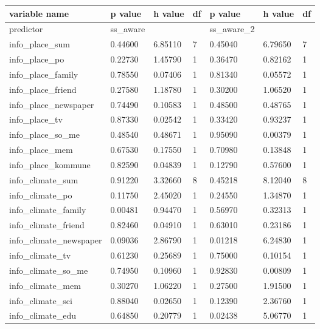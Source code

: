 \documentclass{article}
\begin{document}
\begin{table}[!ht]
    \centering
    \begin{tabular}{|l|l|l|l|l|l|l|}
    \hline
        variable name & p value & h value & df & p value & h value & df \\ \hline
        predictor & ss\_aware & ~ & ~ & ss\_aware\_2 & ~ & ~ \\ \hline
        info\_place\_sum & 0.44600 & 6.85110 & 7 & 0.45040 & 6.79650 & 7 \\ \hline
        info\_place\_po & 0.22730 & 1.45790 & 1 & 0.36470 & 0.82162 & 1 \\ \hline
        info\_place\_family & 0.78550 & 0.07406 & 1 & 0.81340 & 0.05572 & 1 \\ \hline
        info\_place\_friend & 0.27580 & 1.18780 & 1 & 0.30200 & 1.06520 & 1 \\ \hline
        info\_place\_newspaper & 0.74490 & 0.10583 & 1 & 0.48500 & 0.48765 & 1 \\ \hline
        info\_place\_tv & 0.87330 & 0.02542 & 1 & 0.33420 & 0.93237 & 1 \\ \hline
        info\_place\_so\_me & 0.48540 & 0.48671 & 1 & 0.95090 & 0.00379 & 1 \\ \hline
        info\_place\_mem & 0.67530 & 0.17550 & 1 & 0.70980 & 0.13848 & 1 \\ \hline
        info\_place\_kommune & 0.82590 & 0.04839 & 1 & 0.12790 & 0.57600 & 1 \\ \hline
        info\_climate\_sum & 0.91220 & 3.32660 & 8 & 0.45218 & 8.12040 & 8 \\ \hline
        info\_climate\_po & 0.11750 & 2.45020 & 1 & 0.24550 & 1.34870 & 1 \\ \hline
        info\_climate\_family & 0.00481 & 0.94470 & 1 & 0.56970 & 0.32313 & 1 \\ \hline
        info\_climate\_friend & 0.82460 & 0.04910 & 1 & 0.63010 & 0.23186 & 1 \\ \hline
        info\_climate\_newspaper & 0.09036 & 2.86790 & 1 & 0.01218 & 6.24830 & 1 \\ \hline
        info\_climate\_tv & 0.61230 & 0.25689 & 1 & 0.75000 & 0.10154 & 1 \\ \hline
        info\_climate\_so\_me & 0.74950 & 0.10960 & 1 & 0.92830 & 0.00809 & 1 \\ \hline
        info\_climate\_mem & 0.30270 & 1.06220 & 1 & 0.27500 & 1.91500 & 1 \\ \hline
        info\_climate\_sci & 0.88040 & 0.02650 & 1 & 0.12390 & 2.36760 & 1 \\ \hline
        info\_climate\_edu & 0.64850 & 0.20779 & 1 & 0.02438 & 5.06770 & 1 \\ \hline
    \end{tabular}
\end{table}
\end{document}
